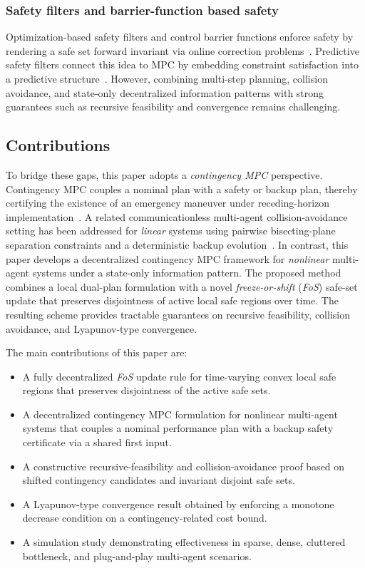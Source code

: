 \documentclass[twocolumn]{autart}
\begin{document}
\subsubsection*{Safety filters and barrier-function based safety}
Optimization-based safety filters and control barrier functions enforce safety by rendering a safe set forward invariant via online correction problems~\cite{Ames2019}. Predictive safety filters connect this idea to MPC by embedding constraint satisfaction into a predictive structure~\cite{Wabersich2021}. However, combining multi-step planning, collision avoidance, and state-only decentralized information patterns with strong guarantees such as recursive feasibility and convergence remains challenging.

\subsection{Contributions}
To bridge these gaps, this paper adopts a \emph{contingency MPC} perspective. Contingency MPC couples a nominal plan with a safety or backup plan, thereby certifying the existence of an emergency maneuver under receding-horizon implementation~\cite{Alsterda2019}. A related communicationless multi-agent collision-avoidance setting has been addressed for \emph{linear} systems using pairwise bisecting-plane separation constraints and a deterministic backup evolution~\cite{Georg}. In contrast, this paper develops a decentralized contingency MPC framework for \emph{nonlinear} multi-agent systems under a state-only information pattern. The proposed method combines a local dual-plan formulation with a novel \textit{freeze-or-shift} (\textit{FoS}) safe-set update that preserves disjointness of active local safe regions over time. The resulting scheme provides tractable guarantees on recursive feasibility, collision avoidance, and Lyapunov-type convergence.

The main contributions of this paper are:
\begin{itemize}
  \item[C1] A fully decentralized \textit{FoS} update rule for time-varying convex local safe regions that preserves disjointness of the active safe sets.
  \item[C2] A decentralized contingency MPC formulation for nonlinear multi-agent systems that couples a nominal performance plan with a backup safety certificate via a shared first input.
  \item[C3] A constructive recursive-feasibility and collision-avoidance proof
based on shifted contingency candidates and invariant disjoint safe sets.
  \item[C4] A Lyapunov-type convergence result obtained by enforcing a monotone decrease condition on a contingency-related cost bound.
  \item[C5] A simulation study demonstrating effectiveness in sparse, dense, cluttered bottleneck, and plug-and-play multi-agent scenarios.
\end{itemize}
\end{document}
